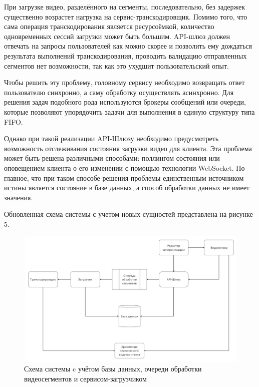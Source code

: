 	При загрузке видео, разделённого на сегменты, последовательно, без задержек существенно возрастет нагрузка на сервис-транскодировщик. Помимо того, что сама операция транскодирования является ресурсоёмкой, количество одновременных сессий загрузки может быть большим. API-шлюз должен отвечать на запросы пользователей как можно скорее и позволить ему дождаться результата выполнений транскодирования, проводить валидацию отправленных сегментов нет возможности, так как это ухудшит пользовательский опыт.

	Чтобы решить эту проблему, головному сервису необходимо возвращать ответ пользователю синхронно, а саму обработку осуществлять асинхронно. Для решения задач подобного рода используются брокеры сообщений или очереди, которые позволяют упорядочить задачи для выполнения в единую структуру типа FIFO.

	Однако при такой реализации API-Шлюзу необходимо предусмотреть возможность отслеживания состояния загрузки видео для клиента. Эта проблема может быть решена различными способами: поллингом состояния или оповещением клиента о его изменении с помощью технологии WebSocket. Но главное, что при таком способе решения проблемы единственным источником истины является состояние в базе данных, а способ обработки данных не имеет значения.

	Обновленная схема системы с учетом новых сущностей представлена на рисунке 5.

	\begin{figure}[ht!] 
		\center
		\includegraphics [scale=0.33] {my_folder/images//system_scheme_4}
		\caption{Схема системы c учётом базы данных, очереди обработки видеосегментов и сервисом-загрузчиком} 
		\label{fig:system_scheme_4}  
	\end{figure}

